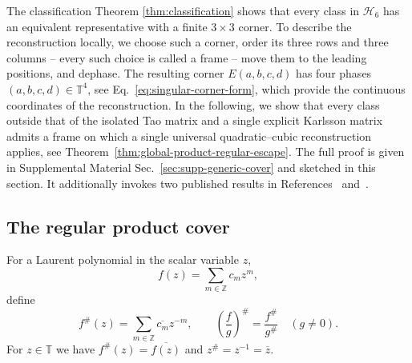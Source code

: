 \documentclass[aps,prx,reprint,nofootinbib,twoside,superscriptaddress,longbibliography,floatfix]{revtex4-2}
\theoremstyle{definition}
\newcommand{\T}{\mathbb T}
\newcommand{\HH}{\mathcal H}
\begin{document}
The classification Theorem \ref{thm:classification} shows that every class in $\HH_6$ has an equivalent representative with a finite $3\times3$ corner. To describe the reconstruction locally, we choose such a corner, order its three rows and three columns -- every such choice is called a frame -- move them to the leading positions, and dephase. The resulting corner $E(a,b,c,d)$ has four phases $(a,b,c,d)\in\T^4$, see Eq.~\eqref{eq:singular-corner-form}, which provide the continuous coordinates of the reconstruction. In the following, we show that every class outside that of the isolated Tao matrix and a single explicit Karlsson matrix admits a frame on which a single universal quadratic--cubic reconstruction applies, see Theorem~\ref{thm:global-product-regular-escape}.
The full proof is given in Supplemental Material Sec.~\ref{sec:supp-generic-cover} and sketched in this section. It additionally invokes two published results in References~\cite{BondalZhdanovskiy2016} and~\cite{BasuPollackRoy2006}.

\subsection{The regular product cover}
\label{subsec:quadratic-cubic-regular-cover}
For a Laurent polynomial in the scalar variable $z$,
\begin{equation}
f(z)=\sum_{m\in\mathbb Z}c_mz^m,
\end{equation}
define
\begin{equation}
f^\#(z)=\sum_{m\in\mathbb Z}\overline{c_m}z^{-m},
\qquad
\left(\frac{f}{g}\right)^\#=\frac{f^\#}{g^\#}\quad(g\neq0).
\label{eq:sharp-definition-main}
\end{equation}
For $z\in\T$ we have $f^\#(z)=\overline{f(z)}$ and $z^\#=z^{-1}=\overline z$.
\end{document}
